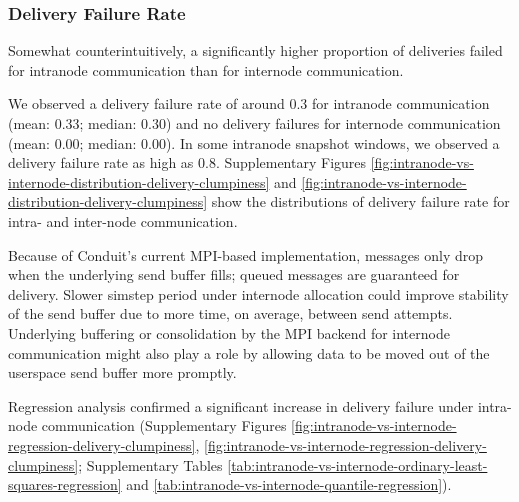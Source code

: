 \subsubsection{Delivery Failure Rate}

Somewhat counterintuitively, a significantly higher proportion of deliveries failed for intranode communication than for internode communication.

We observed a delivery failure rate of around 0.3 for intranode communication (mean: 0.33; median: 0.30) and no delivery failures for internode communication (mean: 0.00; median: 0.00).
In some intranode snapshot windows, we observed a delivery failure rate as high as 0.8.
Supplementary Figures \ref{fig:intranode-vs-internode-distribution-delivery-clumpiness} and \ref{fig:intranode-vs-internode-distribution-delivery-clumpiness} show the distributions of delivery failure rate for intra- and inter-node communication.

Because of Conduit's current MPI-based implementation, messages only drop when the underlying send buffer fills; queued messages are guaranteed for delivery.
Slower simstep period under internode allocation could improve stability of the send buffer due to more time, on average, between send attempts.
Underlying buffering or consolidation by the MPI backend for internode communication might also play a role by allowing data to be moved out of the userspace send buffer more promptly.

Regression analysis confirmed a significant increase in delivery failure under intra-node communication (Supplementary Figures \ref{fig:intranode-vs-internode-regression-delivery-clumpiness}, \ref{fig:intranode-vs-internode-regression-delivery-clumpiness}; Supplementary Tables \ref{tab:intranode-vs-internode-ordinary-least-squares-regression} and \ref{tab:intranode-vs-internode-quantile-regression}).
